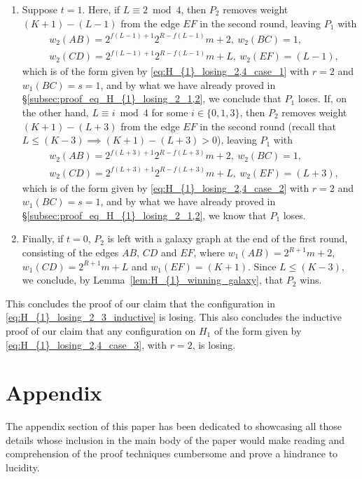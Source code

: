 \documentclass[11pt,reqno]{amsart}
\theoremstyle{definition}
\theoremstyle{definition}
\begin{document}
\begin{enumerate}
\begin{enumerate}
\item Suppose $t=1$. Here, if $L \equiv 2 \bmod 4$, then $P_{2}$ removes weight $(K+1)-(L-1)$ from the edge $EF$ in the second round, leaving $P_{1}$ with
\begin{align}
{}&w_{2}(AB)=2^{f(L-1)+1}2^{R-f(L-1)}m+2,\ w_{2}(BC)=1,\nonumber\\
{}&w_{2}(CD)=2^{f(L-1)+1}2^{R-f(L-1)}m+L,\ w_{2}(EF)=(L-1),\nonumber
\end{align}
which is of the form given by \eqref{eq:H_{1}_losing_2,4_case_1} with $r=2$ and $w_{1}(BC)=s=1$, and by what we have already proved in \S\ref{subsec:proof_eq_H_{1}_losing_2_1,2}, we conclude that $P_{1}$ loses. If, on the other hand, $L \equiv i \bmod 4$ for some $i \in \{0,1,3\}$, then $P_{2}$ removes weight $(K+1)-(L+3)$ from the edge $EF$ in the second round (recall that $L\leqslant (K-3) \implies (K+1)-(L+3)>0$), leaving $P_{1}$ with
\begin{align}
{}&w_{2}(AB)=2^{f(L+3)+1}2^{R-f(L+3)}m+2,\ w_{2}(BC)=1,\nonumber\\
{}&w_{2}(CD)=2^{f(L+3)+1}2^{R-f(L+3)}m+L,\ w_{2}(EF)=(L+3),\nonumber
\end{align}
which is of the form given by \eqref{eq:H_{1}_losing_2,4_case_2} with $r=2$ and $w_{1}(BC)=s=1$, and by what we have already proved in \S\ref{subsec:proof_eq_H_{1}_losing_2_1,2}, we know that $P_{1}$ loses.

\item Finally, if $t=0$, $P_{2}$ is left with a galaxy graph at the end of the first round, consisting of the edges $AB$, $CD$ and $EF$, where $w_{1}(AB)=2^{R+1}m+2$, $w_{1}(CD)=2^{R+1}m+L$ and $w_{1}(EF)=(K+1)$. Since $L\leqslant(K-3)$, we conclude, by Lemma~\ref{lem:H_{1}_winning_galaxy}, that $P_{2}$ wins.
\end{enumerate}
\end{enumerate}

This concludes the proof of our claim that the configuration in \eqref{eq:H_{1}_losing_2_3_inductive} is losing. This also concludes the inductive proof of our claim that any configuration on $H_{1}$ of the form given by \eqref{eq:H_{1}_losing_2,4_case_3}, with $r=2$, is losing.


\section{Appendix}\label{sec:appendix}
The appendix section of this paper has been dedicated to showcasing all those details whose inclusion in the main body of the paper would make reading and comprehension of the proof techniques cumbersome and prove a hindrance to lucidity. 
\end{document}
